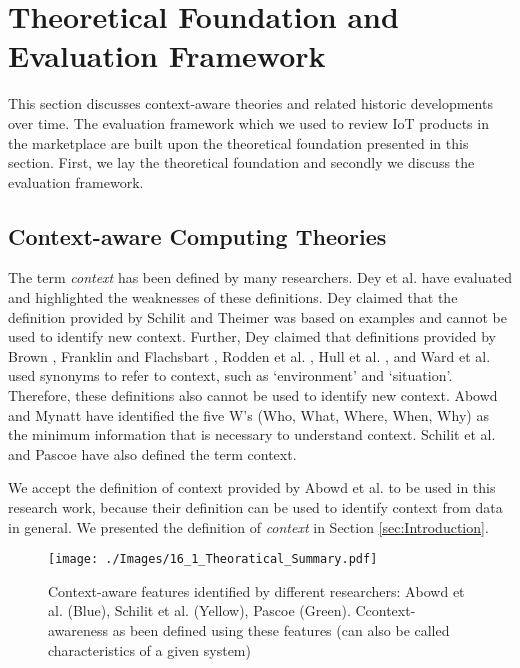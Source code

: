\documentclass[journal]{IEEEtran}
\begin{document}
 \section{Theoretical Foundation and Evaluation Framework}
 \label{sec:Theory}
 
 This section discusses context-aware theories and related historic developments over time. The evaluation framework which we used to review IoT products in the marketplace are built upon the theoretical foundation presented in this section. First, we lay the theoretical foundation and secondly we discuss the evaluation framework.
 

 \subsection{Context-aware Computing Theories}
 
 The term \textit{context} has been defined by many researchers. Dey et al.  \cite{P143} have evaluated and highlighted  the weaknesses of these definitions.  Dey claimed  that the definition provided by Schilit and Theimer  \cite{P173} was based on examples and cannot be used to identify new context. Further, Dey claimed that definitions provided by Brown  \cite{P175}, Franklin and Flachsbart \cite{P178}, Rodden et al. \cite{P181}, Hull et al. \cite{P179}, and Ward et al. \cite{P183} used synonyms  to refer to context,  such as `environment'   and `situation'.  Therefore,  these definitions  also cannot be used to identify new context. Abowd and Mynatt  \cite{P115} have identified the five W's (Who, What, Where, When, Why) as the minimum  information that is necessary to understand context. Schilit et al.  \cite{P116} and Pascoe \cite{P180} have also defined the term context. 
 
 We accept the  definition of context provided by Abowd et al. \cite{P104} to be used  in this research  work, because  their definition can be used to identify context from data in general. We presented the definition of \textit{context} in Section \ref{sec:Introduction}.
 


 \begin{figure}[!b]
  \centering
\texttt{[image: ./Images/16\_1\_Theoratical\_Summary.pdf]}
\caption{Context-aware features identified by different researchers: Abowd et al.  \cite{P104} (Blue), Schilit et al.  \cite{P116} (Yellow), Pascoe \cite{P180} (Green). Ccontext-awareness as been defined using these features (can also be called characteristics of a given system) }
  \label{Figure:Theoratical_Summary}	
\end{figure}
 
\end{document}
